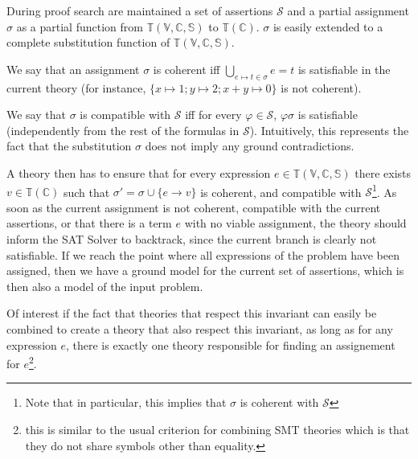 During proof search are maintained a set of assertions $\mathcal{S}$
and a partial assignment $\sigma$ as a partial function from $\mathbb{T}(\mathbb{V, C, S})$
to $\mathbb{T}(\mathbb{C})$. $\sigma$ is easily extended to a complete substitution function of
$\mathbb{T}(\mathbb{V, C, S})$.

We say that an assignment $\sigma$ is coherent iff $\bigcup_{e\mapsto t \in \sigma} e = t$ is satisfiable
in the current theory (for instance, $\{x\mapsto 1; y \mapsto 2; x + y \mapsto 0\}$ is not coherent).

We say that $\sigma$ is compatible with $\mathcal{S}$ iff for every $\varphi \in \mathcal{S}$,
$\varphi\sigma$ is satisfiable (independently from the rest of the formulas in $\mathcal{S}$).
Intuitively, this represents the fact that the substitution $\sigma$ does not imply any
ground contradictions.

A theory then has to ensure that for every expression $e \in \mathbb{T}(\mathbb{V,C,S})$
there exists $v \in \mathbb{T}(\mathbb{C})$ such that $\sigma' = \sigma \cup \{ e \rightarrow v \}$
is coherent, and compatible with $\mathcal{S}$\footnote{Note that in particular, this implies
that $\sigma$ is coherent with $\mathcal{S}$}. As soon as the current assignment is not coherent,
compatible with the current assertions, or that there is a term $e$ with no viable assignment, the theory
should inform the SAT Solver to backtrack, since the current branch is clearly not satisfiable.
If we reach the point where all expressions of the problem have been assigned, then we
have a ground model for the current set of assertions, which is then also a model
of the input problem.

Of interest if the fact that theories that respect this invariant can easily be combined
to create a theory that also respect this invariant, as long as for any expression $e$,
there is exactly one theory responsible for finding an assignement for $e$\footnote{this
is similar to the usual criterion for combining SMT theories which is that they do not
share symbols other than equality.}.

